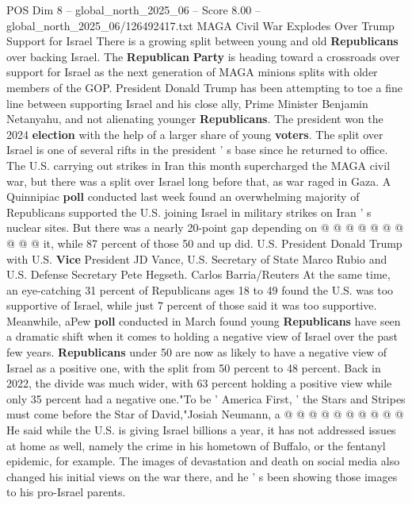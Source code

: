 \begin{textsample}{POS Dim 8 – global\_north\_2025\_06 – Score 8.00 – global\_north\_2025\_06/126492417.txt}  \label{ex:f8_pos_429}
MAGA Civil War Explodes Over Trump Support for Israel There is a growing split between young and old \textbf{Republicans} over backing Israel.
The \textbf{Republican} \textbf{Party} is heading toward a crossroads over support for Israel as the next generation of MAGA minions splits with older members of the GOP.
President Donald Trump has been attempting to toe a fine line between supporting Israel and his close ally, Prime Minister Benjamin Netanyahu, and not alienating younger \textbf{Republicans}.
The president won the 2024 \textbf{election} with the help of a larger share of young \textbf{voters}.
The split over Israel is one of several rifts in the president ' s base since he returned to office.
The U.S. carrying out strikes in Iran this month supercharged the MAGA civil war, but there was a split over Israel long before that, as war raged in Gaza.
A Quinnipiac \textbf{poll} conducted last week found an overwhelming majority of Republicans supported the U.S. joining Israel in military strikes on Iran ' s nuclear sites.
But there was a nearly 20-point gap depending on @ @ @ @ @ @ @ @ @ @ it, while 87 percent of those 50 and up did.
U.S.
President Donald Trump with U.S. \textbf{Vice} President JD Vance, U.S.
Secretary of State Marco Rubio and U.S.
Defense Secretary Pete Hegseth.
Carlos Barria/Reuters At the same time, an eye-catching 31 percent of Republicans ages 18 to 49 found the U.S. was too supportive of Israel, while just 7 percent of those said it was too supportive.
Meanwhile, aPew \textbf{poll} conducted in March found young \textbf{Republicans} have seen a dramatic shift when it comes to holding a negative view of Israel over the past few years. \textbf{Republicans} under 50 are now as likely to have a negative view of Israel as a positive one, with the split from 50 percent to 48 percent.
Back in 2022, the divide was much wider, with 63 percent holding a positive view while only 35 percent had a negative one."To be ' America First, ' the Stars and Stripes must come before the Star of David,"Josiah Neumann, a @ @ @ @ @ @ @ @ @ @ He said while the U.S. is giving Israel billions a year, it has not addressed issues at home as well, namely the crime in his hometown of Buffalo, or the fentanyl epidemic, for example.
The images of devastation and death on social media also changed his initial views on the war there, and he ' s been showing those images to his pro-Israel parents.

\end{textsample}
